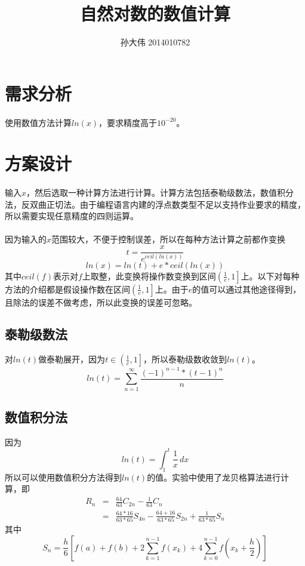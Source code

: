 \documentclass[UTF8,twocolum,titlepage]{ctexart}
\title{自然对数的数值计算}
\author{孙大伟 2014010782}
\date{}
\begin{document}
\maketitle
\boldmath
\section*{需求分析}
\paragraph{}
使用数值方法计算$ln\left(x\right)$，要求精度高于$10^{-20}$。
\section*{方案设计}
\paragraph{}
输入$x$，然后选取一种计算方法进行计算。计算方法包括泰勒级数法，数值积分法，反双曲正切法。由于编程语言内建的浮点数类型不足以支持作业要求的精度，所以需要实现任意精度的四则运算。
\paragraph{}
因为输入的$x$范围较大，不便于控制误差，所以在每种方法计算之前都作变换$$t=\frac{x}{e^{ceil\left(ln\left(x\right)\right)}}$$ $$ln\left(x\right)=ln\left(t\right)+e*ceil\left(ln\left(x\right)\right)$$其中$ceil\left(f\right)$表示对$f$上取整，此变换将操作数变换到区间$\left(\frac{1}{e},1 \right]$上。以下对每种方法的介绍都是假设操作数在区间$\left(\frac{1}{e},1 \right]$上。由于$e$的值可以通过其他途径得到，且除法的误差不做考虑，所以此变换的误差可忽略。
\subsection*{泰勒级数法}
对$ln\left(t\right)$做泰勒展开，因为$t\in\left(\frac{1}{e},1 \right]$，所以泰勒级数收敛到$ln\left(t\right)$。
$$ln\left(t\right)=\sum\limits_{n=1}^{\infty}\frac{\left(-1\right)^{n-1}*\left(t-1\right)^{n}}{n}$$
\subsection*{数值积分法}
因为$$ln\left(t\right)=\int_1^t \frac{1}{x}\,dx$$所以可以使用数值积分方法得到$ln\left(t\right)$的值。实验中使用了龙贝格算法进行计算，即
\begin{eqnarray*}
R_n&=&\frac{64}{63}C_{2n}-\frac{1}{63}C_{n}\\
&=&\frac{64*16}{63*65}S_{4n}-\frac{64+16}{63*65}S_{2n}+\frac{1}{63*65}S_{n}
\end{eqnarray*}
其中
$$S_n=\frac{h}{6}\left[f(a)+f(b)+2\sum_{k=1}^{n-1}f(x_{k})+4\sum_{k=0}^{n-1}f(x_{k}+\frac{h}{2})\right]$$
\end{document}
